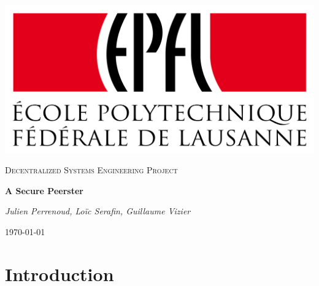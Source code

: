\documentclass[11pt, a4paper]{article}
\newcommand{\authors}{Julien Perrenoud, Loïc Serafin, Guillaume Vizier}
\renewcommand{\title}{A Secure Peerster}
\begin{document}
\begin{titlepage}
	\centering
	\includegraphics[scale=0.1]{epfl.png} \par
	\vspace{1.5cm}

	{\scshape\Large Decentralized Systems Engineering Project\par}
	\vspace{1.5cm}
	{\huge\bfseries \title \par}
	\vspace{2cm}
	{\Large\itshape \authors \par}
	\vfill
	\vfill

	{\large \today \par}

\end{titlepage}

\tableofcontents

\newpage

\section{Introduction}
\end{document}
